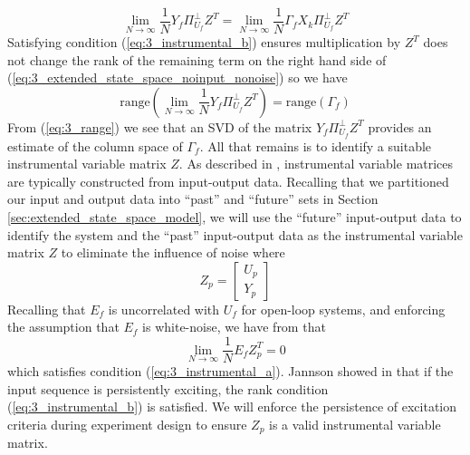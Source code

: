 \begin{equation}\label{eq:3_extended_state_space_noinput_nonoise}
\lim_{N\rightarrow\infty} \frac{1}{N}Y_f\Pi_{U_f}^\perp Z^T = \lim_{N\rightarrow\infty} \frac{1}{N}\Gamma_f X_k\Pi_{U_f}^\perp Z^T
\end{equation}
 Satisfying condition (\ref{eq:3_instrumental_b}) ensures multiplication by $Z^T$ does not change the rank of the remaining term on the right hand side of  (\ref{eq:3_extended_state_space_noinput_nonoise}) so we have
\begin{equation}\label{eq:3_range}
\mbox{range}\left(\lim_{N\rightarrow\infty} \frac{1}{N} Y_f\Pi_{U_f}^\perp Z^T\right) = \mbox{range}\left(\Gamma_f\right)
\end{equation}
From (\ref{eq:3_range}) we see that an SVD of the matrix $Y_f\Pi_{U_f}^\perp Z^T$  provides an estimate of the column space of $\Gamma_f$. All that remains is to identify a suitable instrumental variable matrix $Z$. As described in \cite{soderstrom1983instrumental, verhaegen2007filtering}, instrumental variable matrices are typically constructed from input-output data. Recalling that we partitioned our input and output data into ``past'' and ``future'' sets in Section \ref{sec:extended_state_space_model}, we will use the ``future'' input-output data to identify the system and the ``past'' input-output data as the instrumental variable matrix $Z$ to eliminate the influence of noise where
\begin{equation*}
Z_p = \begin{bmatrix}U_p\\ Y_p\end{bmatrix}
\end{equation*}
Recalling that $E_f$ is uncorrelated with $U_f$ for open-loop systems, and enforcing the assumption that $E_f$ is white-noise, we have from \cite{verhaegen2007filtering} that 
\begin{equation*}
\lim_{N\rightarrow\infty} \frac{1}{N} E_f Z_p^T = 0
\end{equation*}
which satisfies condition (\ref{eq:3_instrumental_a}). Jannson showed in \cite{jansson1997subspace} that if the input sequence is persistently exciting, the rank condition (\ref{eq:3_instrumental_b}) is satisfied. We will enforce the persistence of excitation criteria during experiment design to ensure $Z_p$ is a valid instrumental variable matrix.

